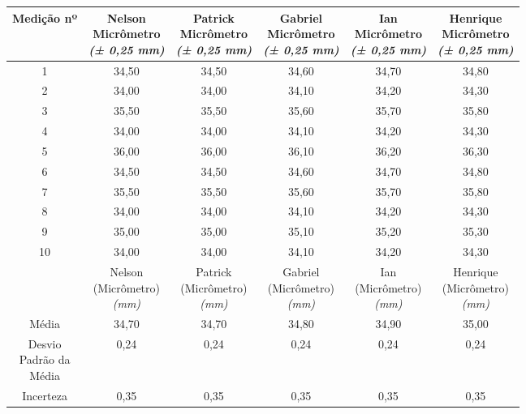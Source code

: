 \documentclass{article}
\begin{document}
\begin{table}[h!]
\centering
\begin{tabular}{c c c c c c }
\toprule
Medição nº & \shortstack{Nelson\\Micrômetro\\\textit{(± 0,25 mm)}} & \shortstack{Patrick\\Micrômetro\\\textit{(± 0,25 mm)}} & \shortstack{Gabriel\\Micrômetro\\\textit{(± 0,25 mm)}} & \shortstack{Ian\\Micrômetro\\\textit{(± 0,25 mm)}} & \shortstack{Henrique\\Micrômetro\\\textit{(± 0,25 mm)}}\\
\midrule
1 & 34,50 & 34,50 & 34,60 & 34,70 & 34,80\\
2 & 34,00 & 34,00 & 34,10 & 34,20 & 34,30\\
3 & 35,50 & 35,50 & 35,60 & 35,70 & 35,80\\
4 & 34,00 & 34,00 & 34,10 & 34,20 & 34,30\\
5 & 36,00 & 36,00 & 36,10 & 36,20 & 36,30\\
6 & 34,50 & 34,50 & 34,60 & 34,70 & 34,80\\
7 & 35,50 & 35,50 & 35,60 & 35,70 & 35,80\\
8 & 34,00 & 34,00 & 34,10 & 34,20 & 34,30\\
9 & 35,00 & 35,00 & 35,10 & 35,20 & 35,30\\
10 & 34,00 & 34,00 & 34,10 & 34,20 & 34,30\\
\midrule
&\shortstack{Nelson\\(Micrômetro)\\\textit{(mm)}} & \shortstack{Patrick\\(Micrômetro)\\\textit{(mm)}} & \shortstack{Gabriel\\(Micrômetro)\\\textit{(mm)}} & \shortstack{Ian\\(Micrômetro)\\\textit{(mm)}} & \shortstack{Henrique\\(Micrômetro)\\\textit{(mm)}}\\
\midrule
Média & 34,70 & 34,70 & 34,80 & 34,90 & 35,00\\[3pt]
\shortstack{Desvio\\Padrão da\\Média} & 0,24 & 0,24 & 0,24 & 0,24 & 0,24\\[3pt]
Incerteza & 0,35 & 0,35 & 0,35 & 0,35 & 0,35\\
\bottomrule
\end{tabular}
\end{table}
\end{document}
